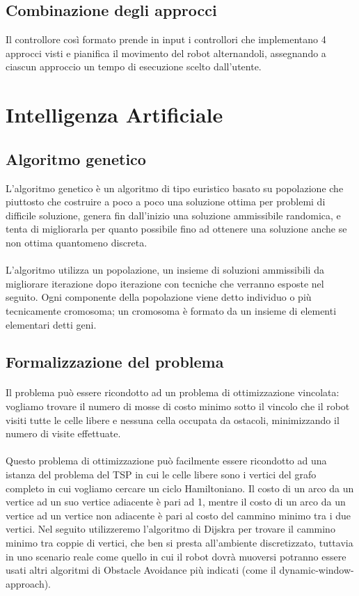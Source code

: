 \documentclass{article}
\begin{document}
\subsection{Combinazione degli approcci}
Il controllore così formato prende in input i controllori che implementano 4 approcci visti e pianifica il movimento del robot alternandoli, assegnando a ciascun approccio un tempo di esecuzione scelto dall'utente.


\section{Intelligenza Artificiale}
\subsection{Algoritmo genetico}
L'algoritmo genetico è un algoritmo di tipo euristico basato su popolazione che piuttosto che costruire a poco a poco una soluzione ottima per problemi di difficile soluzione, genera fin dall'inizio una soluzione ammissibile randomica, e tenta di migliorarla per quanto possibile fino ad ottenere una soluzione anche se non ottima quantomeno discreta.
\paragraph{}
L'algoritmo utilizza un popolazione, un insieme di soluzioni ammissibili da migliorare iterazione dopo iterazione con tecniche che verranno esposte nel seguito. Ogni componente della popolazione viene detto individuo o più tecnicamente cromosoma; un cromosoma è formato da un insieme di elementi elementari detti geni.

\subsection{Formalizzazione del problema}
\paragraph{}
Il problema può essere ricondotto ad un problema di ottimizzazione vincolata: vogliamo trovare il numero di mosse di costo minimo sotto il vincolo che il robot visiti tutte le celle libere e nessuna cella occupata da ostacoli, minimizzando il numero di visite effettuate.

\paragraph{}
Questo problema di ottimizzazione può facilmente essere ricondotto ad una istanza del problema del TSP\cite{wiki-TSP} in cui le celle libere sono i vertici del grafo completo in cui vogliamo cercare un ciclo Hamiltoniano.
Il costo di un arco da un vertice ad un suo vertice adiacente è pari ad 1, mentre il costo di un arco da un vertice ad un vertice non adiacente è pari al costo del cammino minimo tra i due vertici.
Nel seguito utilizzeremo l'algoritmo di Dijskra per trovare il cammino minimo tra coppie di vertici, che ben si presta all'ambiente discretizzato, tuttavia in uno scenario reale come quello in cui il robot dovrà muoversi potranno essere usati altri algoritmi di Obstacle Avoidance più indicati (come il dynamic-window-approach\cite{DWA}).
\end{document}
